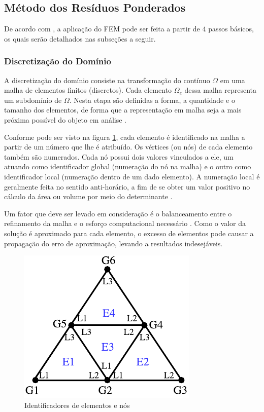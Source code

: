 \documentclass[
    12pt,               %
    openright,          %
    oneside,
    a4paper,            %
    english,            %
    french,             %
    spanish,            %
    brazil              %
    ]{abntex2}
\begin{document}
\subsection{Método dos Resíduos Ponderados}
\label{sec:proc}

De acordo com , a aplicação do FEM pode ser feita a partir de $4$ passos básicos, os quais serão detalhados nas subseções a seguir.


\subsubsection*{Discretização do Domínio} 
A discretização do domínio consiste na transformação do contínuo $\Omega$ em uma malha de elementos finitos (discretos). Cada elemento $\Omega_e$ dessa malha representa um subdomínio de $\Omega$.  
Nesta etapa são definidas a forma, a quantidade e o tamanho dos elementos, de forma que a representação em malha seja a mais próxima possível do objeto em análise \cite{desai}.

Conforme pode ser visto na figura \ref{fig:numeracao}, cada elemento é identificado na malha a partir de um número que lhe é atribuído. Os vértices (ou nós) de cada elemento também são numerados. Cada nó possui dois valores vinculados a ele, um atuando como identificador global (numeração do nó na malha) e o outro como identificador local (numeração dentro de um dado elemento). A numeração local é geralmente feita no sentido anti-horário, a fim de se obter um valor positivo no cálculo da área ou volume por meio do  determinante \cite{sadiku, jin}. 

Um fator que deve ser levado em consideração é o balanceamento entre o refinamento da malha e o esforço computacional necessário \cite{desai}. Como o valor da solução é aproximado para cada elemento, o excesso de elementos pode causar a propagação do erro de aproximação, levando a resultados indesejáveis.


\begin{figure}[!htb]
	\centering
	\includegraphics[scale=1.2]{figuras/id.pdf}
	\caption{Identificadores de elementos e nós}
	\label{fig:numeracao}
\end{figure}
\end{document}
